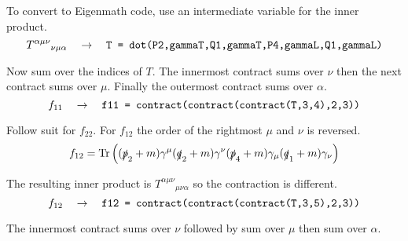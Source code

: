 \documentclass[12pt]{article}
\begin{document}
\noindent
To convert to Eigenmath code, use an intermediate variable for the inner product.
\begin{equation*}
T^{\alpha\mu\nu}{}_{\nu\mu\alpha}
\quad\rightarrow\quad
\text{\tt T = dot(P2,gammaT,Q1,gammaT,P4,gammaL,Q1,gammaL)}
\end{equation*}

\noindent
Now sum over the indices of $T$.
The innermost contract sums over $\nu$ then the next contract sums over $\mu$.
Finally the outermost contract sums over $\alpha$.
\begin{equation*}
f_{11}\quad\rightarrow\quad
\text{\tt f11 = contract(contract(contract(T,3,4),2,3))}
\end{equation*}

\noindent
Follow suit for $f_{22}$.
For $f_{12}$ the order of the rightmost $\mu$ and $\nu$ is reversed.
\begin{equation*}
f_{12}=\mathop{\rm Tr}
\left(
(\slashed{p}_2+m)\gamma^\mu(\slashed{q}_2+m)\gamma^\nu(\slashed{p}_4+m)\gamma_\mu(\slashed{q}_1+m)\gamma_\nu
\right)
\end{equation*}

\noindent
The resulting inner product is $T^{\alpha\mu\nu}{}_{\mu\nu\alpha}$
so the contraction is different.
\begin{equation*}
f_{12}
\quad\rightarrow\quad
\text{\tt f12 = contract(contract(contract(T,3,5),2,3))}
\end{equation*}

\noindent
The innermost contract sums over $\nu$ followed by sum over $\mu$ then sum over $\alpha$.
\end{document}
